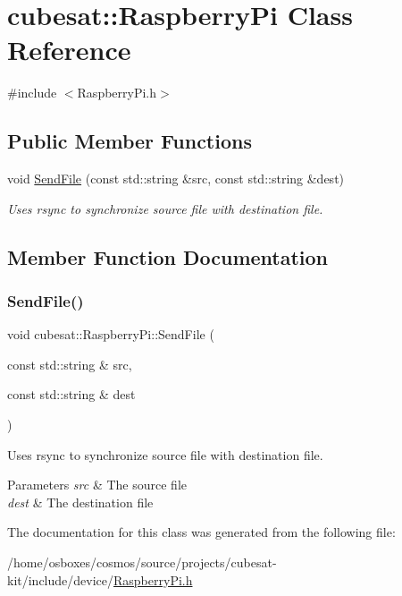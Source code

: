 \hypertarget{classcubesat_1_1RaspberryPi}{}\section{cubesat\+:\+:Raspberry\+Pi Class Reference}
\label{classcubesat_1_1RaspberryPi}


{\ttfamily \#include $<$Raspberry\+Pi.\+h$>$}

\subsection*{Public Member Functions}
\begin{DoxyCompactItemize}
\item 
void \hyperlink{classcubesat_1_1RaspberryPi_a6d6fea9ced78884cf1e8beb2a0f9b2f4}{Send\+File} (const std\+::string \&src, const std\+::string \&dest)
\begin{DoxyCompactList}\small\item\em Uses rsync to synchronize source file with destination file. \end{DoxyCompactList}\end{DoxyCompactItemize}


\subsection{Member Function Documentation}
\mbox{\label{classcubesat_1_1RaspberryPi_a6d6fea9ced78884cf1e8beb2a0f9b2f4}} 
\subsubsection{\texorpdfstring{Send\+File()}{SendFile()}}
{\footnotesize\ttfamily void cubesat\+::\+Raspberry\+Pi\+::\+Send\+File (\begin{DoxyParamCaption}\item[{const std\+::string \&}]{src,  }\item[{const std\+::string \&}]{dest }\end{DoxyParamCaption})}



Uses rsync to synchronize source file with destination file. 


\begin{DoxyParams}{Parameters}
{\em src} & The source file \\
\hline
{\em dest} & The destination file \\
\hline
\end{DoxyParams}


The documentation for this class was generated from the following file\+:\begin{DoxyCompactItemize}
\item 
/home/osboxes/cosmos/source/projects/cubesat-\/kit/include/device/\hyperlink{RaspberryPi_8h}{Raspberry\+Pi.\+h}\end{DoxyCompactItemize}
